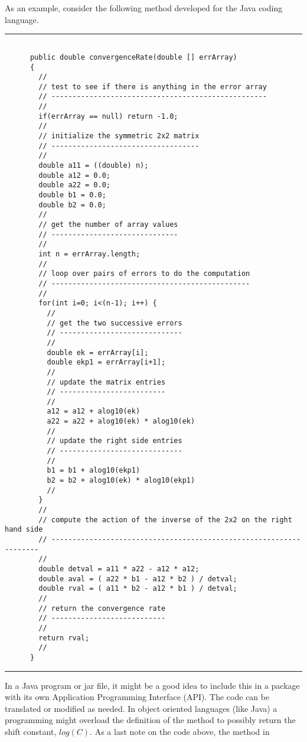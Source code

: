 \documentclass[10pt,fleqn]{article}
\begin{document}
As an example, consider the following method developed for the Java coding
language.
\vskip0.1in\hrule\vskip0.1in
\begin{verbatim}

      public double convergenceRate(double [] errArray)
      {
        //
        // test to see if there is anything in the error array
        // ---------------------------------------------------
        //
        if(errArray == null) return -1.0;
        //
        // initialize the symmetric 2x2 matrix
        // -----------------------------------
        //
        double a11 = ((double) n);
        double a12 = 0.0;
        double a22 = 0.0;
        double b1 = 0.0;
        double b2 = 0.0;
        //
        // get the number of array values
        // ------------------------------
        //
        int n = errArray.length;
        //
        // loop over pairs of errors to do the computation
        // -----------------------------------------------
        //
        for(int i=0; i<(n-1); i++) {
          //
          // get the two successive errors
          // -----------------------------
          //
          double ek = errArray[i];
          double ekp1 = errArray[i+1];
          //
          // update the matrix entries
          // -------------------------
          //
          a12 = a12 + alog10(ek)
          a22 = a22 + alog10(ek) * alog10(ek)
          //
          // update the right side entries
          // -----------------------------
          //
          b1 = b1 + alog10(ekp1)
          b2 = b2 + alog10(ek) * alog10(ekp1)
          //
        }
        //
        // compute the action of the inverse of the 2x2 on the right hand side
        // -------------------------------------------------------------------
        //
        double detval = a11 * a22 - a12 * a12;
        double aval = ( a22 * b1 - a12 * b2 ) / detval;
        double rval = ( a11 * b2 - a12 * b1 ) / detval;
        //
        // return the convergence rate
        // ---------------------------
        //
        return rval;
        //
      }

\end{verbatim}
\vskip0.1in\hrule\vskip0.1in
In a Java program or jar file, it might be a good idea to include this in a
package with its own Application Programming Interface (API). The code can
be translated or modified as needed. In object oriented languages (like Java)
a programming might overload the definition of the method to possibly return
the shift constant, $log(C)$. As a last note on the code above, the method in
\end{document}
